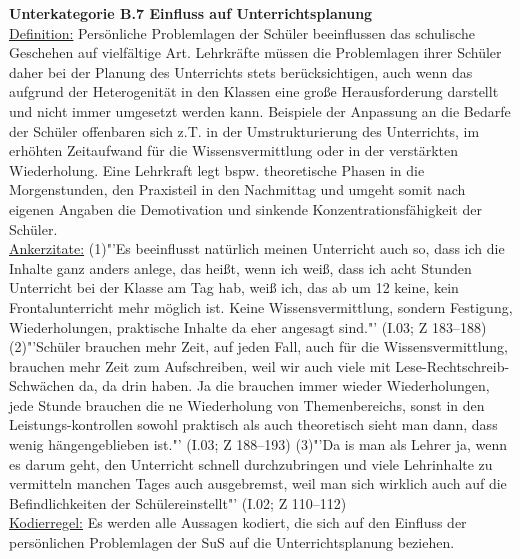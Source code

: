 \textbf{Unterkategorie B.7 Einfluss auf Unterrichtsplanung}\\
\underline{Definition:} Persönliche Problemlagen der Schüler beeinflussen das schulische Geschehen auf vielfältige Art. Lehrkräfte müssen die Problemlagen ihrer Schüler daher bei der Planung des Unterrichts stets berücksichtigen, auch wenn das aufgrund der Heterogenität in den Klassen eine große Herausforderung darstellt und nicht immer umgesetzt werden kann. Beispiele der Anpassung an die Bedarfe der Schüler offenbaren sich z.T. in der Umstrukturierung des Unterrichts, im erhöhten Zeitaufwand für die Wissensvermittlung oder in der verstärkten Wiederholung. Eine Lehrkraft legt bspw. theoretische Phasen in die Morgenstunden, den Praxisteil in den Nachmittag und umgeht somit nach eigenen Angaben die Demotivation und sinkende Konzentrationsfähigkeit der Schüler.\\
\underline{Ankerzitate:} (1)"'Es beeinflusst natürlich meinen Unterricht auch so, dass ich die Inhalte ganz anders anlege, das heißt, wenn ich weiß, dass ich acht Stunden Unterricht bei der Klasse am Tag hab, weiß ich, das ab um 12 keine, kein Frontalunterricht mehr möglich ist. Keine Wissensvermittlung, sondern Festigung, Wiederholungen, praktische Inhalte da eher angesagt sind."' (I.03; Z 183--188) (2)"'Schüler brauchen mehr Zeit, auf jeden Fall, auch für die Wissensvermittlung, brauchen mehr Zeit zum Aufschreiben, weil wir auch viele mit Lese-Rechtschreib-Schwächen da, da drin haben. Ja die brauchen immer wieder Wiederholungen, jede Stunde brauchen die ne Wiederholung von Themenbereichs, sonst in den Leistungs-kontrollen sowohl praktisch als auch theoretisch sieht man dann, dass wenig hängengeblieben ist."' (I.03; Z 188--193) (3)"'Da is man als Lehrer ja, wenn es darum geht, den Unterricht schnell durchzubringen und viele Lehrinhalte zu vermitteln manchen Tages auch ausgebremst, weil man sich wirklich auch auf die Befindlichkeiten der Schülereinstellt"' (I.02; Z 110--112)\\
\underline{Kodierregel:} Es werden alle Aussagen kodiert, die sich auf den Einfluss der persönlichen Problemlagen der SuS auf die Unterrichtsplanung beziehen.\\

